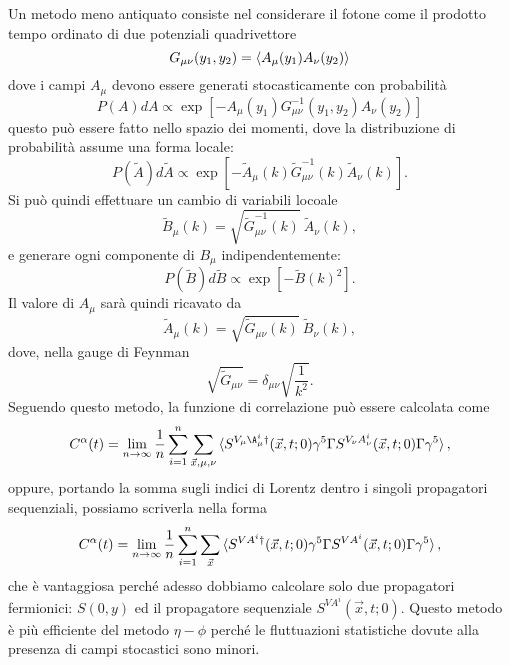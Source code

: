 \documentclass[LaM]{sapthesis}
\begin{document}
	Un metodo meno antiquato consiste nel considerare il fotone come il prodotto tempo ordinato di due potenziali quadrivettore
	\begin{equation*}
		G_{\mu\nu}(y_1,y_2)=\braket{A_\mu(y_1)A_\nu(y_2)}
	\end{equation*}
	dove i campi $A_\mu$ devono essere generati stocasticamente con probabilità
	\begin{equation*}
		P(A)dA\propto\exp{[-A_\mu(y_1) G^{-1}_{\mu\nu}(y_1,y_2)A_\nu(y_2)]}
	\end{equation*}
	questo può essere fatto nello spazio dei momenti, dove la distribuzione di probabilità assume una forma locale:
	\begin{equation*}
		P(\tilde{A})d\tilde{A}\propto\exp{[-\tilde{A}_\mu(k) \tilde{G}^{-1}_{\mu\nu}(k)\tilde{A}_\nu(k)]}.
	\end{equation*}
	Si può quindi effettuare un cambio di variabili locoale
	\begin{equation*}
		\tilde{B}_\mu(k)=\sqrt{\tilde{G}^{-1}_{\mu\nu}(k)} \ \tilde{A}_\nu(k),
	\end{equation*}
	 e generare ogni componente di $B_\mu$ indipendentemente:
	 \begin{equation*}
	 	P(\tilde{B})d\tilde{B}\propto\exp[-\tilde{B}(k)^2].
	 \end{equation*}
	Il valore di $A_\mu$ sarà quindi ricavato da
	\begin{equation*}
		\tilde{A}_\mu(k)=\sqrt{\tilde{G}_{\mu\nu}(k)} \ \tilde{B}_\nu(k),
	\end{equation*}
	dove, nella gauge di Feynman
	\begin{equation*}
		\sqrt{\tilde{G}_{\mu\nu}}=\delta_{\mu\nu}\sqrt{\frac{1}{k^2}}.
	\end{equation*}
	Seguendo questo metodo, la funzione di correlazione può essere calcolata come
	\begin{equation}
	C^\alpha(t)=\lim_{n\to\infty}\frac{1}{n}\sum_{i=1}^{n}\sum_{\vec{x},\mu,\nu} \braket{S^{V_\mu\A_\mu^i\dagger}(\vec{x},t;0)\gamma^5\Gamma S^{V_\nu A^i_\nu}(\vec{x},t;0)\Gamma\gamma^5},
	\end{equation}
	oppure, portando la somma sugli indici di Lorentz dentro i singoli propagatori sequenziali, possiamo scriverla nella forma
	\begin{equation}
	C^\alpha(t)=\lim_{n\to\infty}\frac{1}{n}\sum_{i=1}^{n}\sum_{\vec{x}} \braket{S^{VA^i\dagger}(\vec{x},t;0)\gamma^5\Gamma S^{VA^i}(\vec{x},t;0)\Gamma\gamma^5},
	\end{equation}
	che è vantaggiosa perché adesso dobbiamo calcolare solo due propagatori fermionici: $S(0,y)$ ed il propagatore sequenziale $S^{VA^i}(\vec{x},t;0)$. Questo metodo è più efficiente del metodo $\eta-\phi$ \color{red}perché le fluttuazioni statistiche dovute alla presenza di campi stocastici sono minori\color{black}.
\end{document}
